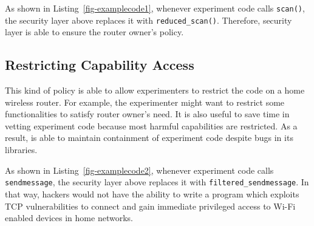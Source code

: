 

As shown in Listing~\ref{fig-examplecode1}, whenever experiment code calls \texttt{scan()}, the security layer above replaces it with \texttt{reduced\_scan()}. Therefore, security layer is able to ensure the router owner's policy.

\subsection{Restricting Capability Access}
This kind of policy is able to allow experimenters to restrict the code on a home wireless router. For example, the experimenter might want to restrict some functionalities to satisfy router owner's need. It is also useful to save time in vetting experiment code because most harmful capabilities are restricted. As a result, \sysname is able to maintain containment of experiment code despite bugs in its libraries.



As shown in Listing~\ref{fig-examplecode2}, whenever experiment code calls \texttt{sendmessage}, the security layer above replaces it with \texttt{filtered\_sendmessage}. In that way, hackers would not have the ability to write a program which exploits TCP vulnerabilities to connect and gain immediate privileged access to Wi-Fi enabled devices in home networks. 

 